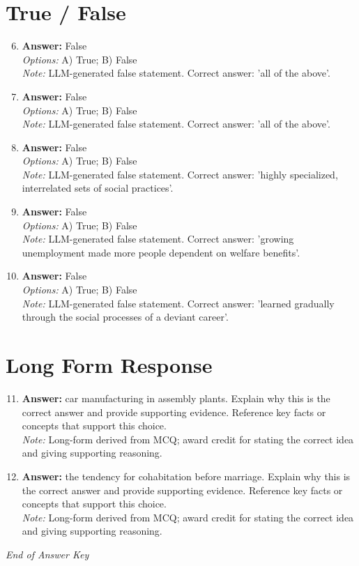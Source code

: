 \documentclass[12pt]{article}
\begin{document}
\section*{True / False}
\begin{enumerate}[label=\arabic*.]
\setcounter{enumi}{5}
\item \textbf{Answer:} False
\\ \textit{Options:} A) True; B) False
\\ \textit{Note:} LLM-generated false statement. Correct answer: 'all of the above'.
\item \textbf{Answer:} False
\\ \textit{Options:} A) True; B) False
\\ \textit{Note:} LLM-generated false statement. Correct answer: 'all of the above'.
\item \textbf{Answer:} False
\\ \textit{Options:} A) True; B) False
\\ \textit{Note:} LLM-generated false statement. Correct answer: 'highly specialized, interrelated sets of social practices'.
\item \textbf{Answer:} False
\\ \textit{Options:} A) True; B) False
\\ \textit{Note:} LLM-generated false statement. Correct answer: 'growing unemployment made more people dependent on welfare benefits'.
\item \textbf{Answer:} False
\\ \textit{Options:} A) True; B) False
\\ \textit{Note:} LLM-generated false statement. Correct answer: 'learned gradually through the social processes of a deviant career'.
\end{enumerate}

\section*{Long Form Response}
\begin{enumerate}[label=\arabic*.]
\setcounter{enumi}{10}
\item \textbf{Answer:} car manufacturing in assembly plants. Explain why this is the correct answer and provide supporting evidence. Reference key facts or concepts that support this choice.
\\ \textit{Note:} Long-form derived from MCQ; award credit for stating the correct idea and giving supporting reasoning.
\item \textbf{Answer:} the tendency for cohabitation before marriage. Explain why this is the correct answer and provide supporting evidence. Reference key facts or concepts that support this choice.
\\ \textit{Note:} Long-form derived from MCQ; award credit for stating the correct idea and giving supporting reasoning.
\end{enumerate}

\vfill
\noindent\textit{End of Answer Key}
\end{document}
